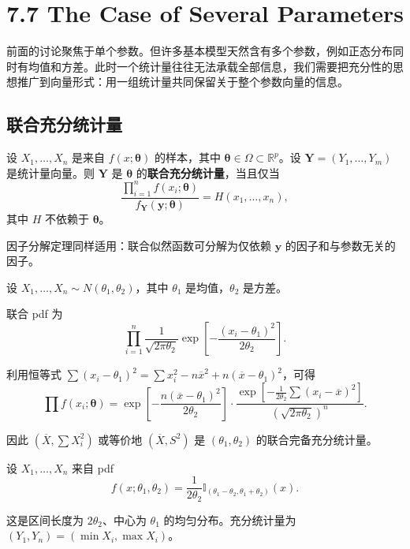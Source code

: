 \section{7.7 The Case of Several Parameters}\label{sec:7.7}

前面的讨论聚焦于单个参数。但许多基本模型天然含有多个参数，例如正态分布同时有均值和方差。此时一个统计量往往无法承载全部信息，我们需要把充分性的思想推广到向量形式：用一组统计量共同保留关于整个参数向量的信息。

\subsection{联合充分统计量}

\begin{definition}[联合充分统计量]\label{def:joint-sufficient}
设 $X_1, \ldots, X_n$ 是来自 $f(x; \boldsymbol{\theta})$ 的样本，其中 $\boldsymbol{\theta} \in \Omega \subset \mathbb{R}^p$。设 $\mathbf{Y} = (Y_1, \ldots, Y_m)$ 是统计量向量。则 $\mathbf{Y}$ 是 $\boldsymbol{\theta}$ 的\textbf{联合充分统计量}，当且仅当
\[
\frac{\prod_{i=1}^n f(x_i; \boldsymbol{\theta})}{f_{\mathbf{Y}}(\mathbf{y}; \boldsymbol{\theta})} = H(x_1, \ldots, x_n),
\]
其中 $H$ 不依赖于 $\boldsymbol{\theta}$。
\end{definition}

因子分解定理同样适用：联合似然函数可分解为仅依赖 $\mathbf{y}$ 的因子和与参数无关的因子。

\begin{example}[双参数正态分布]\label{ex:normal-two-param}
设 $X_1, \ldots, X_n \sim N(\theta_1, \theta_2)$，其中 $\theta_1$ 是均值，$\theta_2$ 是方差。

联合 pdf 为
\[
\prod_{i=1}^n \frac{1}{\sqrt{2\pi\theta_2}} \exp\left[-\frac{(x_i - \theta_1)^2}{2\theta_2}\right].
\]

利用恒等式 $\sum (x_i - \theta_1)^2 = \sum x_i^2 - n\overline{x}^2 + n(\overline{x} - \theta_1)^2$，可得
\[
\prod f(x_i; \boldsymbol{\theta}) = \exp\left[-\frac{n(\overline{x} - \theta_1)^2}{2\theta_2}\right] \cdot \frac{\exp\left[-\frac{1}{2\theta_2}\sum(x_i - \overline{x})^2\right]}{(\sqrt{2\pi\theta_2})^n}.
\]

因此 $(\overline{X}, \sum X_i^2)$ 或等价地 $(\overline{X}, S^2)$ 是 $(\theta_1, \theta_2)$ 的联合完备充分统计量。
\end{example}

\begin{example}[均匀分布的双参数]\label{ex:uniform-two-param}
设 $X_1, \ldots, X_n$ 来自 pdf
\[
f(x; \theta_1, \theta_2) = \frac{1}{2\theta_2} \mathbb{I}_{(\theta_1 - \theta_2, \theta_1 + \theta_2)}(x).
\]

这是区间长度为 $2\theta_2$、中心为 $\theta_1$ 的均匀分布。充分统计量为 $(Y_1, Y_n) = (\min X_i, \max X_i)$。
\end{example}

